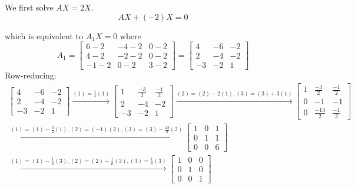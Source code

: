 \documentclass[a4paper, 11pt]{article}
\begin{document}
\begin{solution}
    We first solve \(AX = 2X\).
    \[
        AX + (-2)X = 0
    \]

    which is equivalent to \(A_1X = 0\) where \[
        A_1 = \left[\begin{array}{ccc}
                6 -2  & -4 -2 & 0 -2  \\
                4 -2  & -2 -2 & 0 -2  \\
                -1 -2 & 0 -2  & 3  -2
            \end{array}\right] = \left[\begin{array}{ccc}
                4  & -6 & -2 \\
                2  & -4 & -2 \\
                -3 & -2 & 1
            \end{array}\right]
    \]
    Row-reducing:
    \begin{multline*}
        \left[\begin{array}{ccc}
                4  & -6 & -2 \\
                2  & -4 & -2 \\
                -3 & -2 & 1
            \end{array}\right] \xrightarrow{(1) = \frac{1}{4}(1)}
        \left[\begin{array}{ccc}
                1  & \frac{-3}{2} & \frac{-1}{2} \\
                2  & -4           & -2           \\
                -3 & -2           & 1
            \end{array}\right] \xrightarrow{(2) = (2) - 2(1), (3) = (3) + 3(1)}
        \left[\begin{array}{ccc}
                1 & \frac{-3}{2}  & \frac{-1}{2} \\
                0 & -1            & -1           \\
                0 & \frac{-13}{2} & \frac{-1}{2}
            \end{array}\right]
        \\
        \xrightarrow{(1) = (1) - \frac{3}{2}(1), (2) = (-1)(2), (3) = (3) - \frac{13}{2}(2) } \left[\begin{array}{ccc}
                1 & 0 & 1 \\
                0 & 1 & 1 \\
                0 & 0 & 6
            \end{array}\right] \\
        \xrightarrow{(1) = (1)-\frac{1}{6} (3), (2) = (2)-\frac{1}{6} (3), (3) = \frac{1}{6} (3)}
        \left[\begin{array}{ccc}
                1 & 0 & 0 \\
                0 & 1 & 0 \\
                0 & 0 & 1
            \end{array}\right]
    \end{multline*}


\end{solution}
\end{document}
